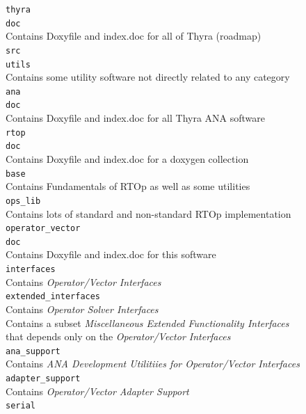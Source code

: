 \documentclass[pdf,ps2pdf,11pt]{SANDreport}
\begin{document}
\bifthen
\>\texttt{thyra} \\
\>\>\texttt{doc}\\
\>\>\>Contains Doxyfile and index.doc for all of Thyra (roadmap) \\
\>\>\texttt{src} \\
\>\>\>\texttt{utils}\\
\>\>\>\>Contains some utility software not directly related to any category \\
\>\>\>\texttt{ana} \\
\>\>\>\>\texttt{doc}\\
\>\>\>\>\>Contains Doxyfile and index.doc for all Thyra ANA software \\
\>\>\>\>\texttt{rtop}\\
\>\>\>\>\>\texttt{doc}\\
\>\>\>\>\>\>Contains Doxyfile and index.doc for a doxygen collection \\
\>\>\>\>\>\texttt{base}\\
\>\>\>\>\>\>Contains Fundamentals of RTOp as well as some utilities \\
\>\>\>\>\>\texttt{ops\_lib}\\
\>\>\>\>\>\>Contains lots of standard and non-standard RTOp implementation \\
\>\>\>\>\texttt{operator\_vector} \\
\>\>\>\>\>\texttt{doc}\\
\>\>\>\>\>\>Contains Doxyfile and index.doc for this software \\
\>\>\>\>\>\texttt{interfaces} \\
\>\>\>\>\>\>Contains {}\textit{Operator/Vector Interfaces} \\
\>\>\>\>\>\texttt{extended\_interfaces} \\
\>\>\>\>\>\>Contains {}\textit{Operator Solver Interfaces} \\
\>\>\>\>\>\>Contains a subset {}\textit{Miscellaneous Extended Functionality Interfaces} \\
\>\>\>\>\>\>\>that depends only on the {}\textit{Operator/Vector Interfaces} \\
\>\>\>\>\>\texttt{ana\_support}\\
\>\>\>\>\>\>Contains {}\textit{ANA Development Utilitiies for Operator/Vector Interfaces} \\
\>\>\>\>\>\texttt{adapter\_support}\\
\>\>\>\>\>\>Contains {}\textit{Operator/Vector Adapter Support} \\
\>\>\>\>\>\>\texttt{serial}\\
\end{document}
